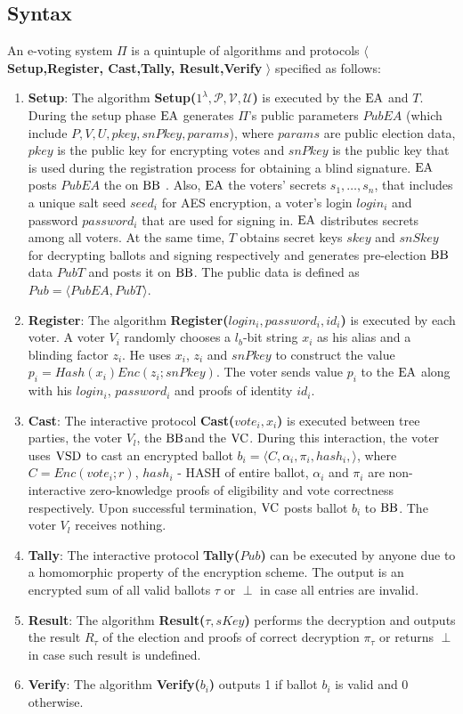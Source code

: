 \subsection{Syntax}
An e-voting system $\Pi$ is a quintuple of algorithms and protocols $\langle$ \textbf{Setup,Register, Cast,Tally, Result,Verify} $\rangle$ specified as follows:
\begin{enumerate}
\item \textbf{Setup}: The algorithm \textbf{Setup($1^{\lambda}, \mathcal{P}, \mathcal{V}, \mathcal{U}$)}  is executed by the $\operatorname{EA}$ and $T$. During the setup phase $\operatorname{EA}$ generates $\Pi$'s public parameters $PubEA$ (which include $P, V, U, pkey, snPkey, params$), where $params$ are public election data, $pkey$ is the public key for encrypting votes and $snPkey$ is the public key that is used during the registration process for obtaining a blind signature. $\operatorname{EA}$ posts  $PubEA$  the on $\operatorname{BB}$ . Also, $\operatorname{EA}$ the voters' secrets $s_1, \dots , s_n$, that includes a unique salt seed $seed_i$ for AES encryption, a voter's login $login_i$ and password $password_i$ that are used for signing in. $\operatorname{EA}$ distributes secrets among all voters. At the same time, $T$  obtains secret keys $skey$ and $snSkey$ for decrypting ballots and signing respectively and generates pre-election $\operatorname{BB}$ data $PubT$ and posts it on $\operatorname{BB}$. The public data is defined as $Pub = \langle PubEA, PubT \rangle $. 
\item  \textbf{Register}: The algorithm \textbf{Register($login_i,password_i,id_i$)}  is executed by each voter. A voter $V_i$ randomly chooses a $l_b$-bit string $x_i$ as his alias and a blinding factor $z_i$. He uses $x_i$, $z_i$ and $snPkey$ to construct the value $p_i = Hash(x_i)Enc(z_i;snPkey)$. The voter sends value $p_i$ to the $\operatorname{EA}$ along with his $login_i$, $password_i$ and proofs of identity $id_i$.
\item  \textbf{Cast}:  The interactive protocol \textbf{Cast($vote_i,x_i$)} is executed between tree parties, the voter $V_l$, the $\operatorname{BB}$and the $\operatorname{VC}$. During this interaction, the voter uses $\operatorname{VSD}$ to cast an encrypted ballot $b_i = \langle C, \alpha_i, \pi_i, hash_i, \rangle$, where $C=Enc(vote_i;r)$, $hash_i$ - HASH of entire ballot,  $\alpha_i$ and $\pi_i$  are non-interactive zero-knowledge proofs of eligibility and vote correctness respectively. Upon successful termination, $\operatorname{VC}$ posts ballot $b_i$ to $\operatorname{BB}$. The voter $V_l$ receives nothing.
\item  \textbf{Tally}: The interactive protocol \textbf{Tally($Pub$)}  can be executed by anyone due to a homomorphic property of the encryption scheme. The output is an encrypted sum of all valid ballots $\tau$ or $\perp$ in case all entries are invalid.
\item   \textbf{Result}: The algorithm  \textbf{Result($\tau, sKey$)} performs the decryption and outputs the result $R_{\tau}$ of the election and proofs of correct decryption $\pi_{\tau}$ or returns  $\perp$in case such result is undefined.
\item  \textbf{Verify}: The algorithm \textbf{Verify($b_i$)} outputs 1 if ballot $b_i$ is valid and 0 otherwise.
\end{enumerate}

